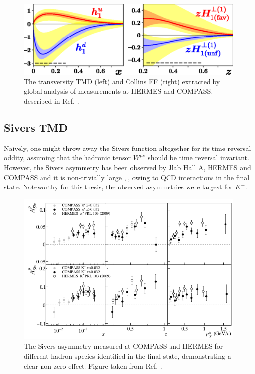 \begin{figure}
	\centering
	\includegraphics[width=\textwidth]{image/plots/introduction/transversity.png}
	\caption{The transversity TMD (left) and Collins FF (right) extracted by global analysis of measurements at HERMES and COMPASS, described in Ref. \cite{tmds-lin:2017}.}
	\label{fig:trans}
\end{figure}

\subsection{Sivers TMD}
Naively, one might throw away the Sivers function altogether for its time reversal oddity, assuming that the hadronic tensor $W^{\mu\nu}$ should be time reversal invariant.  However, the Sivers asymmetry has been observed by Jlab Hall A, HERMES and COMPASS and it is non-trivially large \cite{tmds-adolph:2014}, \cite{tmds-qian:2011}, owing to QCD interactions in the final state.  Noteworthy for this thesis, the observed asymmetries were largest for $K^+$.  

\begin{figure}
	\centering
	\includegraphics[width = \textwidth]{image/plots/introduction/sivers.png}
	\caption{The Sivers asymmetry measured at COMPASS and HERMES for different hadron species identified in the final state, demonstrating a clear non-zero effect.  Figure taken from Ref. \cite{tmds-airapetian:2009}.}
	\label{fig:sivers}
\end{figure}

